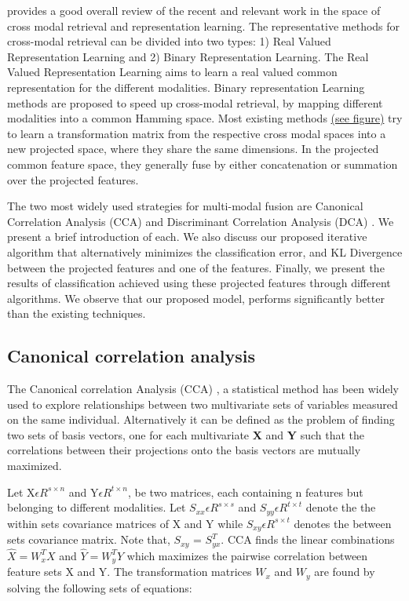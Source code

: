 \documentclass{article}
\begin{document}
\cite{review} provides a good overall review of the recent and relevant work in the space of cross modal retrieval and representation learning. The representative methods for cross-modal retrieval can be divided into two types: 1) Real Valued Representation Learning and 2) Binary Representation Learning. The Real Valued Representation Learning aims to learn a real valued common representation for the different modalities. Binary representation Learning methods are proposed to speed up cross-modal retrieval, by mapping different modalities into a common Hamming space. Most existing methods \hyperref[fig:overview1]{(see figure)} try to learn a transformation matrix from the respective cross modal spaces into a new projected space, where they share the same dimensions. In the projected common feature space, they generally fuse by either concatenation or summation over the projected features.

The two most widely used strategies for multi-modal fusion are Canonical Correlation Analysis (CCA) \cite{cca} and Discriminant Correlation Analysis (DCA) \cite{dca}. We present a brief introduction of each. We also discuss our proposed iterative algorithm that alternatively minimizes the classification error, and KL Divergence between the projected features and one of the features. Finally, we present the results of classification achieved using these projected features through different algorithms. We observe that our proposed model, performs significantly better than the existing techniques.

\subsection{Canonical correlation analysis}
The Canonical correlation Analysis (CCA) \cite{dca_1}, a statistical method has been widely used to explore relationships between two multivariate sets of variables measured on the same individual. Alternatively it can be defined as the problem of finding two sets of basis vectors, one for each multivariate \textbf{X} and \textbf{Y} such that the correlations between their projections onto the basis vectors are mutually maximized.


Let X$\epsilon$$R^{s\times n}$ and Y$\epsilon$$R^{t\times n}$, be two matrices, each containing n features but belonging to different modalities. Let $S_{xx} \epsilon R^{s\times s}$ and $S_{yy} \epsilon R^{t\times t}$ denote the the within sets covariance matrices of X and Y while $S_{xy} \epsilon R^{s\times t}$ denotes the between sets covariance matrix. Note that, $S_{xy}$ = $S_{yx}^T$. CCA finds the linear combinations $\hat{X} = W_x^T X$ and $\hat{Y} = W_y^T Y$ which maximizes the pairwise correlation between feature sets X and Y. The transformation matrices $W_x$ and $W_y$ are found by solving the following sets of equations:
\end{document}
